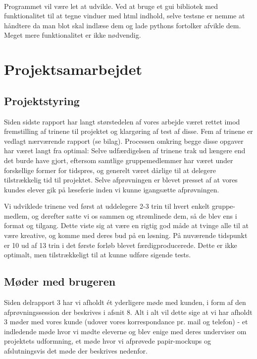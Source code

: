 \documentclass[10pt,a4paper,danish]{article}
\begin{document}
\paragraph{}
Programmet vil være let at udvikle. Ved at bruge et gui bibliotek med funktionalitet til at tegne vinduer med html indhold, selve testsne er nemme at håndtere da man blot skal indlæse dem og lade pythons fortolker afvikle dem. Meget mere funktionalitet er ikke nødvendig.



\section{Projektsamarbejdet}
\subsection{Projektstyring}
Siden sidste rapport har langt størstedelen af vores arbejde været rettet imod
fremstilling af trinene til projektet og klargøring af test af disse. Fem af trinene
er vedlagt nærværende rapport (se bilag). Processen
omkring begge disse opgaver har været langt fra optimal: Selve udfærdigelsen af 
trinene trak ud længere end det burde have gjort, eftersom samtlige gruppemedlemmer
har været under forskellige former for tidspres, og generelt været dårlige til 
at delegere tilstrækkelig tid til projektet. Selve afprøvningen er blevet presset
af at vores kundes elever gik på læseferie inden vi kunne igangsætte afprøvningen. 

Vi udviklede trinene ved først at uddelegere 2-3 trin til hvert enkelt gruppe-
medlem, og derefter satte vi os sammen og strømlinede dem, så de blev ens i
format og tilgang. Dette viste sig at være en rigtig god måde at tvinge alle
til at være kreative, og komme med deres bud på en løsning. På nuværende tidspunkt
er 10 ud af 13 trin i det første forløb blevet færdigproducerede. Dette er ikke 
optimalt, men tilstrækkeligt til at kunne udføre sigende tests.

\subsection{Møder med brugeren}
Siden delrapport 3 har vi afholdt ét yderligere møde med kunden, i form af 
den afprøvningssession der beskrives i afsnit 8. Alt i alt vil dette sige 
at vi har afholdt 3 møder med vores kunde (udover vores korrespondance pr. 
mail og telefon) - et indledende møde hvor vi mødte eleverne og blev enige
med deres underviser om projektets udformning, et møde hvor vi afprøvede 
papir-mockups og afslutningsvis det møde der beskrives nedenfor. 
\end{document}
